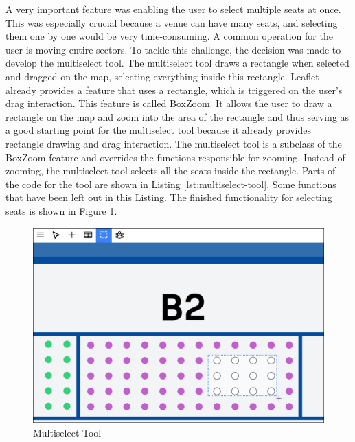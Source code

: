 A very important feature was enabling the user to select multiple seats at once. This was especially crucial because a venue can have many seats, and selecting them one by one would be very time-consuming. A common operation for the user is moving entire sectors. To tackle this challenge, the decision was made to develop the multiselect tool. The multiselect tool draws a rectangle when selected and dragged on the map, selecting everything inside this rectangle. Leaflet already provides a feature that uses a rectangle, which is triggered on the user's drag interaction. This feature is called BoxZoom. It allows the user to draw a rectangle on the map and zoom into the area of the rectangle and thus serving as a good starting point for the multiselect tool because it already provides rectangle drawing and drag interaction. The multiselect tool is a subclass of the BoxZoom feature and overrides the functions responsible for zooming. Instead of zooming, the multiselect tool selects all the seats inside the rectangle. Parts of the code for the tool are shown in Listing \ref{lst:multiselect-tool}. Some functions that have been left out in this Listing. The finished functionality for selecting seats is shown in Figure \ref{fig:multiselect-tool}.
\begin{figure}
    \centering
    \includegraphics[scale=0.3]{pics/multiselect.png}
    \caption{Multiselect Tool}
    \label{fig:multiselect-tool}
\end{figure}

